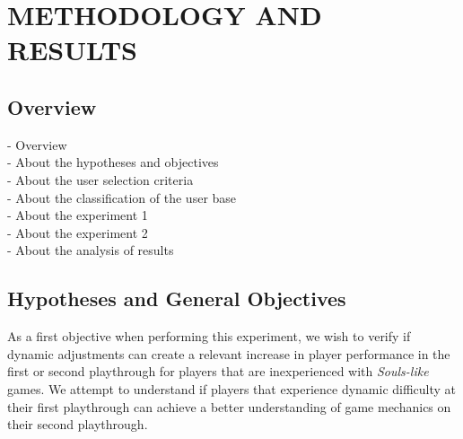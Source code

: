 \chapter{METHODOLOGY AND RESULTS}
\label{ch:methodology-results}

\section{Overview}

- Overview \\
- About the hypotheses and objectives \\
- About the user selection criteria \\
- About the classification of the user base \\
- About the experiment 1 \\
- About the experiment 2 \\
- About the analysis of results 


\section{Hypotheses and General Objectives}


As a first objective when performing this experiment, we wish to verify if dynamic adjustments can create a relevant increase in player performance in the first or second playthrough for players that are inexperienced with \emph{Souls-like} games. We attempt to understand if players that experience dynamic difficulty at their first playthrough can achieve a better understanding of game mechanics on their second playthrough.

